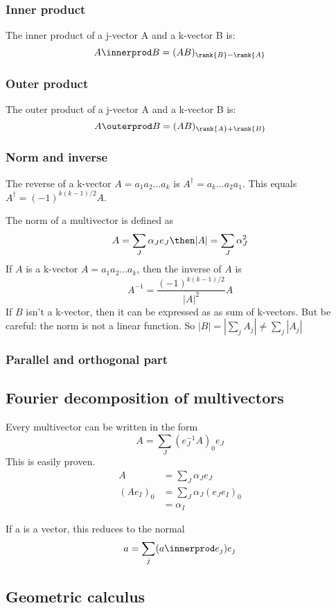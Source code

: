 \subsubsection{Inner product}
The inner product of a j-vector A and a k-vector B is:
$$ A \innerprod B = (AB)_{\rank{B} - \rank{A}} $$

\subsubsection{Outer product}
The outer product of a j-vector A and a k-vector B is: 
$$ A \outerprod B = (AB)_{\rank{A} + \rank{B}}$$

\subsubsection{Norm and inverse}

The reverse of a k-vector $A = a_1 a_2 ... a_k$ is $A^\dagger = a_k ... a_2 a_1$. This equals $A^\dagger = (-1)^{k(k-1)/2} A$. 

The norm of a multivector is defined as 
$$ A = \sum_J \alpha_J e_J \then |A| = \sum_J \alpha_J^2 $$
If $A$ is a k-vector $A = a_1 a_2 ... a_k$, then the inverse of $A$ is 
$$ A^{-1} = \frac{(-1)^{k(k-1)/2}}{|A|^2} A $$
If $B$ isn't a k-vector, then it can be expressed as as sum of k-vectors. But be careful: the norm is not a linear function. So $|B| = |\sum_j A_j| \neq \sum_j |A_j|$


\subsubsection{Parallel and orthogonal part}

\subsection{Fourier decomposition of multivectors}
Every multivector can be written in the form
$$ A = \sum_J (e_J^{-1}A)_0 e_J$$
This is easily proven. 
\begin{equation}
    \begin{split}
        A &= \sum_J \alpha_J e_J \\
        (A e_I)_0 &= \sum_J \alpha_J (e_J e_I)_0 \\
                &= \alpha_I
    \end{split}
\end{equation}

If a is a vector, this reduces to the normal 
$$ a = \sum_j (a \innerprod e_j) e_j$$


\subsection{Geometric calculus}


